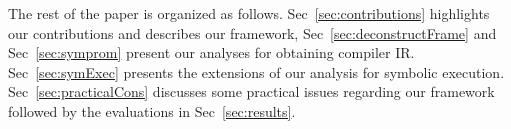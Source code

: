 The rest of the paper is organized as follows. Sec~\ref{sec:contributions} highlights our contributions and describes our framework, Sec~\ref{sec:deconstructFrame} and Sec~\ref{sec:symprom} present our analyses for obtaining compiler IR. Sec~\ref{sec:symExec} presents the extensions of our analysis for symbolic execution. Sec~\ref{sec:practicalCons} discusses some practical issues regarding our framework followed by the evaluations in Sec~\ref{sec:results}.


